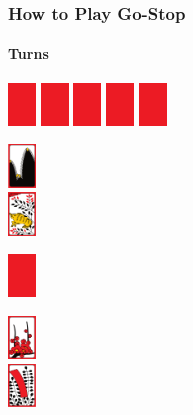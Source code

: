 \begin{frame}[fragile]
  \frametitle{How to Play Go-Stop}
  \framesubtitle{Turns}

  \begin{center}
    \parbox{\textwidth}{
      \centering
      \includegraphics[width=2em]{images/cards/hidden}
      \includegraphics[width=2em]{images/cards/hidden}
      \includegraphics[width=2em]{images/cards/hidden}
      \includegraphics[width=2em]{images/cards/hidden}
      \includegraphics[width=2em]{images/cards/hidden}
    }

    \vspace*{1.5em}

    \parbox{\textwidth}{
      \centering
      \parbox{2em}{
        \includegraphics[width=2em]{images/cards/J011}\\
        \includegraphics[width=2em]{images/cards/A07}
      }
      \quad
      \parbox{2em}{%
        \vspace*{0em}%
        \includegraphics[width=2em]{images/cards/hidden}
      }
      \quad
      \parbox{2em}{
        \includegraphics[width=2em]{images/cards/J020}\\
        \includegraphics[width=2em]{images/cards/R04}
      }
    }


\end{center}
\end{frame}
